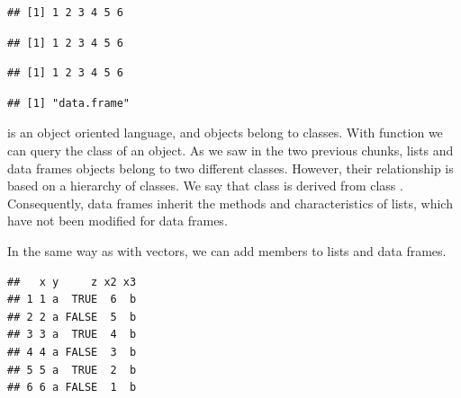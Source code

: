 \documentclass[krantz2]{krantz}\usepackage{knitr}%
\begin{document}
\begin{knitrout}\footnotesize
{}\color{fgcolor}\begin{kframe}
\begin{alltt}
\hlopt{$}
\end{alltt}
\begin{verbatim}
## [1] 1 2 3 4 5 6
\end{verbatim}
\begin{alltt}
\hlstd{a.df[[}\hlstd{]]}
\end{alltt}
\begin{verbatim}
## [1] 1 2 3 4 5 6
\end{verbatim}
\begin{alltt}
\hlstd{a.df[[}\hlstd{]]}
\end{alltt}
\begin{verbatim}
## [1] 1 2 3 4 5 6
\end{verbatim}
\begin{alltt}
\end{alltt}
\begin{verbatim}
## [1] "data.frame"
\end{verbatim}
\end{kframe}
\end{knitrout}

\Rlang is an object oriented language, and objects belong to classes. With function  we can query the class of an object. As we saw in the two previous chunks, lists and data frames objects belong to two different classes. However, their relationship is based on a hierarchy of classes. We say that class  is derived from class . Consequently, data frames inherit the methods and characteristics of lists, which have not been modified for data frames.

In the same way as with vectors, we can add members to lists and data frames.

\begin{knitrout}\footnotesize
{}\color{fgcolor}\begin{kframe}
\begin{alltt}
\hlopt{$} \hlkwb{<-} \hlopt{:}
\hlopt{$} \hlkwb{<-} 
\end{alltt}
\begin{verbatim}
##   x y     z x2 x3
## 1 1 a  TRUE  6  b
## 2 2 a FALSE  5  b
## 3 3 a  TRUE  4  b
## 4 4 a FALSE  3  b
## 5 5 a  TRUE  2  b
## 6 6 a FALSE  1  b
\end{verbatim}
\end{kframe}
\end{knitrout}
\end{document}
